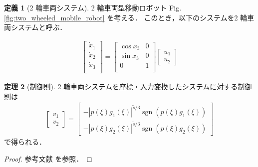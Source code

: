 \documentclass[a4j,10pt,onecolumn,oneside,titlepage,final]{jarticle}
\newcommand{\figref}[1]{Fig.\,\ref{#1}}
\newcommand{\sgn}{\operatorname{sgn}}
\theoremstyle{definition}
\newtheorem{definition}{定義}
\newtheorem{theorem}[definition]{定理}
\begin{document}
\begin{definition}[2 輪車両システム]
  \label{def:system}
  2 輪車両型移動ロボット \figref{fig:two_wheeled_mobile_robot} を考える．
  このとき，以下のシステムを2 輪車両システムと呼ぶ．

  \begin{align}
    \left[
      \begin{array}{c}
      \dot x_1 \\
      \dot x_2 \\
      \dot x_3 \\
      \end{array}
    \right]
    =
    \left[
      \begin{array}{cc}
      \cos x_3 & 0\\
      \sin x_3 & 0\\
      0 & 1 \\
      \end{array}
    \right]
    \left[
    \begin{array}{cc}
    u_1 \\
    u_2
    \end{array}
    \right]
    \label{system:two_wheeled_mobile_robot}
  \end{align}
\end{definition}

\begin{theorem}[制御則]
  \label{theo:controller}
  2 輪車両システムを座標・入力変換したシステムに対する制御則は
  \begin{align}
    \left[
      \begin{array}{c}
        v_1 \\
        v_2
      \end{array}
    \right]
    = 
    \left[
    \begin{array}{c}
      - \left| p(\xi) g_1(\xi) \right|^{\tilde s/ 3} \sgn \left( p(\xi) g_1(\xi) \right) \\
      - \left| p(\xi) g_2(\xi) \right|^{\tilde s/ 3} \sgn \left( p(\xi) g_2(\xi) \right)
    \end{array}
    \right]
    \label{eq:controller}
  \end{align}
  で得られる．
\end{theorem}

\begin{proof}
  参考文献\cite{kimura2022} を参照．
\end{proof}
\end{document}
